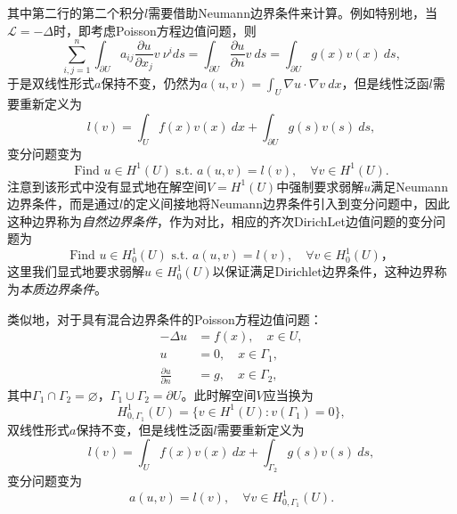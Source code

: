 \documentclass[a4paper,10pt]{ctexart}
\begin{document}
其中第二行的第二个积分$ l $需要借助Neumann边界条件来计算。例如特别地，当$ \mathcal{L} = -\Delta $时，即考虑Poisson方程边值问题，则
\[
    \sum_{i,j=1}^n\int_{\partial U} a_{ij}\dfrac{\partial u}{\partial x_j}  v\ \nu^id s = \int_{\partial U} \frac{\partial u}{\partial n}v\ d s = \int_{\partial U} g(x)v(x)\ d s,
\]
于是双线性形式$ a $保持不变，仍然为$ a(u,v) = \int_U \nabla u\cdot \nabla v\ dx $，但是线性泛函$ l $需要重新定义为
\begin{equation}
    l(v) = \int_U f(x)v(x)\ d x + \int_{\partial U} g(s)v(s)\ d s,
\end{equation}
变分问题变为
\begin{equation}
    \text{Find } u\in H^1(U) \text{ s.t. } a(u,v) = l(v),\quad \forall v\in H^1(U).
\end{equation}
注意到该形式中没有显式地在解空间$ V = H^1(U) $中强制要求弱解$ u $满足Neumann边界条件，而是通过$ l $的定义间接地将Neumann边界条件引入到变分问题中，因此这种边界称为\emph{自然边界条件}，作为对比，相应的齐次DirichLet边值问题的变分问题为
\begin{equation}
    \text{Find } u\in H^1_0(U) \text{ s.t. } a(u,v) = l(v),\quad \forall v\in H^1_0(U)，
\end{equation}
这里我们显式地要求弱解$ u\in H^1_0(U) $以保证满足Dirichlet边界条件，这种边界称为\emph{本质边界条件}。

类似地，对于具有混合边界条件的Poisson方程边值问题：
\begin{equation}
    \begin{aligned}
        -\Delta u &= f(x),\quad x\in U,\\
        u &= 0, \quad x\in \Gamma_1,\\
        \frac{\partial u}{\partial n} &= g, \quad x\in \Gamma_2,
    \end{aligned}
\end{equation}
其中$ \Gamma_1\cap \Gamma_2 = \varnothing $，$ \Gamma_1\cup \Gamma_2 = \partial U $。此时解空间$ V $应当换为
\begin{equation}
    H^1_{0,\Gamma_1}(U) = \{v\in H^1(U): v(\Gamma_1)=0 \},
\end{equation}
双线性形式$ a $保持不变，但是线性泛函$ l $需要重新定义为
\begin{equation}
    l(v) = \int_U f(x)v(x)\ d x + \int_{\Gamma_2} g(s)v(s)\ d s,
\end{equation}
变分问题变为
\begin{equation}
    a(u,v) = l(v),\quad \forall v\in H^1_{0,\Gamma_1}(U).
\end{equation}
\end{document}
